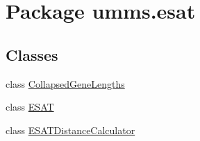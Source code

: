 \hypertarget{namespaceumms_1_1esat}{\section{Package umms.\+esat}
\label{namespaceumms_1_1esat}
}
\subsection*{Classes}
\begin{DoxyCompactItemize}
\item 
class \hyperlink{classumms_1_1esat_1_1_collapsed_gene_lengths}{Collapsed\+Gene\+Lengths}
\item 
class \hyperlink{classumms_1_1esat_1_1_e_s_a_t}{E\+S\+A\+T}
\item 
class \hyperlink{classumms_1_1esat_1_1_e_s_a_t_distance_calculator}{E\+S\+A\+T\+Distance\+Calculator}
\end{DoxyCompactItemize}
